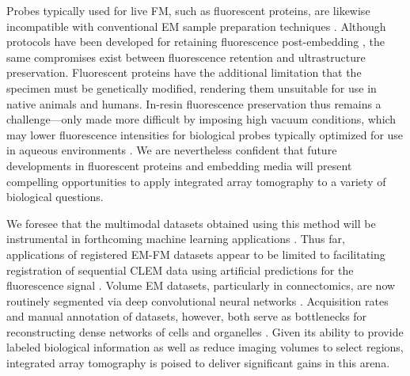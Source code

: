 Probes typically used for live FM, such as fluorescent proteins, are likewise incompatible with conventional EM sample preparation techniques \cite{de2015correlated}. Although protocols have been developed for retaining fluorescence post-embedding \cite{kukulski2011correlated, watanabe2011protein, peddie2014correlative, fu2020meosem}, the same compromises exist between fluorescence retention and ultrastructure preservation. Fluorescent proteins have the additional limitation that the specimen must be genetically modified, rendering them unsuitable for use in native animals and humans. In-resin fluorescence preservation thus remains a challenge—only made more difficult by imposing high vacuum conditions, which may lower fluorescence intensities for biological probes typically optimized for use in aqueous environments \cite{peddie2014correlative}. We are nevertheless confident that future developments in fluorescent proteins and embedding media will present compelling opportunities to apply integrated array tomography to a variety of biological questions.

We foresee that the multimodal datasets obtained using this method will be instrumental in forthcoming machine learning applications \cite{eckstein2020microtubule, liu2020automatic, heinrich2021whole}. Thus far, applications of registered EM-FM datasets appear to be limited to facilitating registration of sequential CLEM data using artificial predictions for the fluorescence signal \cite{ounkomol2018label, seifert2020deepclem}. Volume EM datasets, particularly in connectomics, are now routinely segmented via deep convolutional neural networks \cite{buhmann2021automatic, heinrich2021whole}. Acquisition rates and manual annotation of datasets, however, both serve as bottlenecks for reconstructing dense networks of cells and organelles \cite{kornfeld2018progress}. Given its ability to provide labeled biological information as well as reduce imaging volumes to select regions, integrated array tomography is poised to deliver significant gains in this arena.

